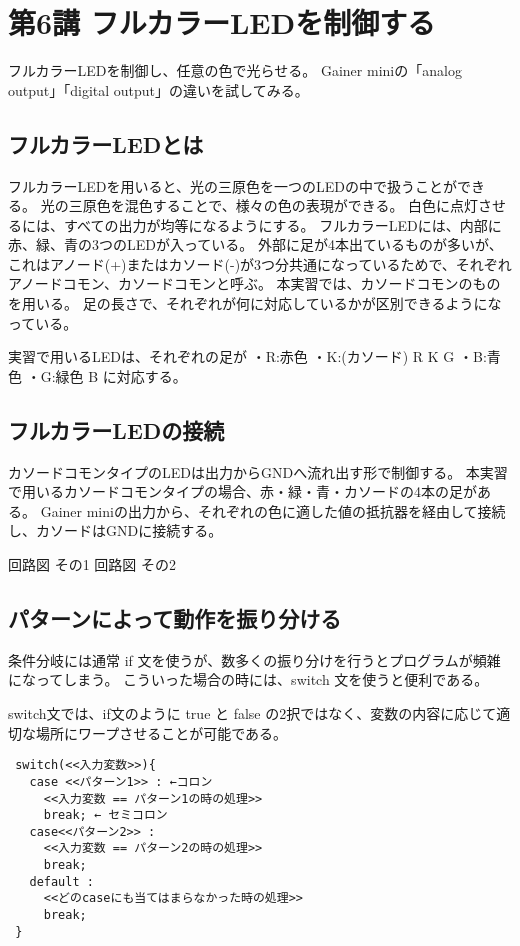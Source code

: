\documentclass[11pt,a4paper]{jarticle}
\begin{document}
\section*{\LARGE{第6講 フルカラーLEDを制御する}}
フルカラーLEDを制御し、任意の色で光らせる。
Gainer miniの「analog output」「digital output」の違いを試してみる。



\subsection*{フルカラーLEDとは}
フルカラーLEDを用いると、光の三原色を一つのLEDの中で扱うことができる。
光の三原色を混色することで、様々の色の表現ができる。
白色に点灯させるには、すべての出力が均等になるようにする。
フルカラーLEDには、内部に赤、緑、青の3つのLEDが入っている。
外部に足が4本出ているものが多いが、これはアノード(+)またはカソード(-)が3つ分共通になっているためで、それぞれアノードコモン、カソードコモンと呼ぶ。
本実習では、カソードコモンのものを用いる。
足の長さで、それぞれが何に対応しているかが区別できるようになっている。

実習で用いるLEDは、それぞれの足が
 ・R:赤色
 ・K:­(カソード)
R
K
G  ・B:青色
 ・G:緑色
B に対応する。

\subsection*{フルカラーLEDの接続}
カソードコモンタイプのLEDは出力からGNDへ流れ出す形で制御する。
本実習で用いるカソードコモンタイプの場合、赤・緑・青・カソードの4本の足がある。
Gainer miniの出力から、それぞれの色に適した値の抵抗器を経由して接続し、カソードはGNDに接続する。


回路図 その1
回路図 その2


\subsection*{パターンによって動作を振り分ける}
条件分岐には通常 if 文を使うが、数多くの振り分けを行うとプログラムが頻雑になってしまう。
こういった場合の時には、switch 文を使うと便利である。

switch文では、if文のように true と false の2択ではなく、変数の内容に応じて適切な場所にワープさせることが可能である。

\begin{lstlisting}
 switch(<<入力変数>>){
   case <<パターン1>> : ←コロン
     <<入力変数 == パターン1の時の処理>>
     break; ← セミコロン
   case<<パターン2>> :
     <<入力変数 == パターン2の時の処理>>
     break;
   default :
     <<どのcaseにも当てはまらなかった時の処理>>
     break;
 }
\end{lstlisting}
\end{document}
